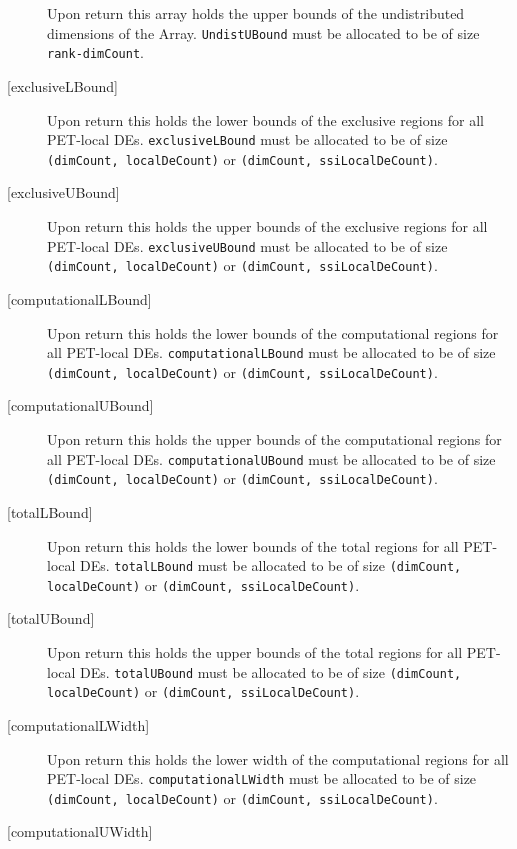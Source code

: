 \begin{description}
   \begin{sloppypar}
   Upon return this array holds the upper bounds of the undistributed
   dimensions of the Array. {\tt UndistUBound} must be allocated to be
   of size {\tt rank-dimCount}.
   \end{sloppypar}
   \item[{[exclusiveLBound]}]
   \begin{sloppypar}
   Upon return this holds the lower bounds of the exclusive regions for
   all PET-local DEs. {\tt exclusiveLBound} must be allocated to be
   of size {\tt (dimCount, localDeCount)} or
   {\tt (dimCount, ssiLocalDeCount)}.
   \end{sloppypar}
   \item[{[exclusiveUBound]}]
   \begin{sloppypar}
   Upon return this holds the upper bounds of the exclusive regions for
   all PET-local DEs. {\tt exclusiveUBound} must be allocated to be
   of size {\tt (dimCount, localDeCount)} or
   {\tt (dimCount, ssiLocalDeCount)}.
   \end{sloppypar}
   \item[{[computationalLBound]}]
   Upon return this holds the lower bounds of the computational regions for
   all PET-local DEs. {\tt computationalLBound} must be allocated to be
   of size {\tt (dimCount, localDeCount)} or
   {\tt (dimCount, ssiLocalDeCount)}.
   \item[{[computationalUBound]}]
   Upon return this holds the upper bounds of the computational regions for
   all PET-local DEs. {\tt computationalUBound} must be allocated to be
   of size {\tt (dimCount, localDeCount)} or
   {\tt (dimCount, ssiLocalDeCount)}.
   \item[{[totalLBound]}]
   Upon return this holds the lower bounds of the total regions for
   all PET-local DEs. {\tt totalLBound} must be allocated to be
   of size {\tt (dimCount, localDeCount)} or
   {\tt (dimCount, ssiLocalDeCount)}.
   \item[{[totalUBound]}]
   Upon return this holds the upper bounds of the total regions for
   all PET-local DEs. {\tt totalUBound} must be allocated to be
   of size {\tt (dimCount, localDeCount)} or
   {\tt (dimCount, ssiLocalDeCount)}.
   \item[{[computationalLWidth]}]
   Upon return this holds the lower width of the computational regions for
   all PET-local DEs. {\tt computationalLWidth} must be allocated to be
   of size {\tt (dimCount, localDeCount)} or
   {\tt (dimCount, ssiLocalDeCount)}.
   \item[{[computationalUWidth]}]

\end{description}

